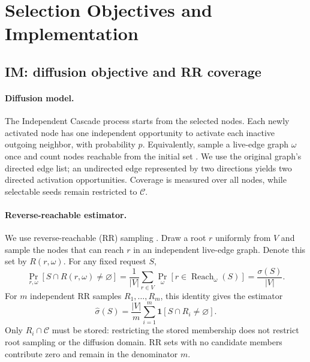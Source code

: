 \section{Selection Objectives and Implementation}
\label{app:selectors}

\subsection{IM: diffusion objective and RR coverage}
\label{app:im-details}

\paragraph{Diffusion model.}
The Independent Cascade process starts from the selected nodes. Each newly activated node has one independent opportunity to activate each inactive outgoing neighbor, with probability $p$. Equivalently, sample a live-edge graph $\omega$ once and count nodes reachable from the initial set \citep{kempe2003maximizing}. We use the original graph's directed edge list; an undirected edge represented by two directions yields two directed activation opportunities. Coverage is measured over all nodes, while selectable seeds remain restricted to $\mathcal C$.

\paragraph{Reverse-reachable estimator.}
We use reverse-reachable (RR) sampling \citep{tang2014influence}. Draw a root $r$ uniformly from $V$ and sample the nodes that can reach $r$ in an independent live-edge graph. Denote this set by $R(r,\omega)$. For any fixed request $S$,
\begin{equation}
\Pr_{r,\omega}\!\left[S\cap R(r,\omega)\ne\varnothing\right]
=\frac{1}{|V|}\sum_{r\in V}
\Pr_\omega\!\left[r\in\operatorname{Reach}_{\omega}(S)\right]
=\frac{\sigma(S)}{|V|}.
\label{eq:rr-identity}
\end{equation}
For $m$ independent RR samples $R_1,\ldots,R_m$, this identity gives the estimator
\begin{equation}
\widehat{\sigma}(S)=\frac{|V|}{m}
\sum_{i=1}^{m}\mathbf{1}[S\cap R_i\ne\varnothing].
\label{eq:im-rr}
\end{equation}
Only $R_i\cap\mathcal C$ must be stored: restricting the stored membership does not restrict root sampling or the diffusion domain. RR sets with no candidate members contribute zero and remain in the denominator $m$.

